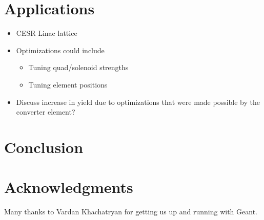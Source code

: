 \documentclass[letter,
               biblatex,     %
               keeplastbox,   %
               ]{jacow}
\begin{document}
\section{Applications}

\begin{itemize}
\item
CESR Linac lattice

\item
Optimizations could include
\begin{itemize}
\item
Tuning quad/solenoid strengths

\item
Tuning element positions

\end{itemize}

\item
Discuss increase in yield due to optimizations that were made possible by the converter element?

\end{itemize}


\section{Conclusion}

\section{Acknowledgments}

Many thanks to Vardan Khachatryan for getting us up and running with Geant.


\printbibliography

\clearpage
\end{document}
